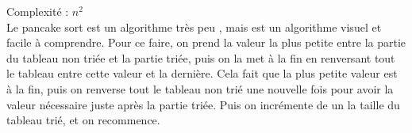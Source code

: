 \label{pancakeSort}
\footnotesize 
\noindent
Complexité :  $ n^2$
\\
\normalsize
    Le pancake sort est un algorithme très peu , mais est un algorithme visuel et facile à comprendre. Pour ce faire, on prend la valeur la plus petite entre la partie du tableau non triée et la partie triée, puis on la met à la fin en renversant tout le tableau entre cette valeur et la dernière. Cela fait que la plus petite valeur est à la fin, puis on renverse tout le tableau non trié une nouvelle fois pour avoir la valeur nécessaire juste après la partie triée. Puis on incrémente de un la taille du tableau trié, et on recommence.